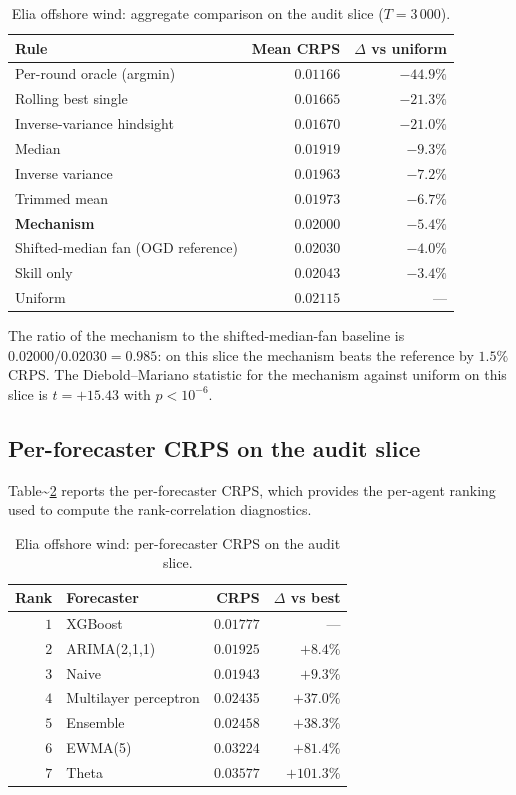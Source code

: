 \documentclass[
  11pt,
  a4paper,
  oneside]{report}
\begin{document}
\begin{table}[h]
\centering
\small
\begin{tabular}{lrr}
\toprule
Rule & Mean CRPS & $\Delta$ vs uniform \\
\midrule
Per-round oracle (argmin) & $0.01166$ & $-44.9\%$ \\
Rolling best single & $0.01665$ & $-21.3\%$ \\
Inverse-variance hindsight & $0.01670$ & $-21.0\%$ \\
Median & $0.01919$ & $-9.3\%$ \\
Inverse variance & $0.01963$ & $-7.2\%$ \\
Trimmed mean & $0.01973$ & $-6.7\%$ \\
\textbf{Mechanism} & $\mathbf{0.02000}$ & $\mathbf{-5.4\%}$ \\
Shifted-median fan (OGD reference)
  & $0.02030$ & $-4.0\%$ \\
Skill only & $0.02043$ & $-3.4\%$ \\
Uniform & $0.02115$ & --- \\
\bottomrule
\end{tabular}
\caption{Elia offshore wind: aggregate comparison on the audit slice
($T = 3\,000$).}
\label{tab:wind-audit}
\end{table}

The ratio of the mechanism to the shifted-median-fan baseline is
\(0.02000 / 0.02030 = 0.985\): on this slice the mechanism beats the
reference by \(1.5\%\) CRPS. The Diebold--Mariano statistic for the
mechanism against uniform on this slice is \(t = +15.43\) with
\(p < 10^{-6}\).

\subsection{Per-forecaster CRPS on the audit
slice}\label{per-forecaster-crps-on-the-audit-slice}

Table\textasciitilde{}\ref{tab:wind-audit-per-agent} reports the
per-forecaster CRPS, which provides the per-agent ranking used to
compute the rank-correlation diagnostics.

\begin{table}[h]
\centering
\small
\begin{tabular}{rlrr}
\toprule
Rank & Forecaster & CRPS & $\Delta$ vs best \\
\midrule
$1$ & XGBoost & $0.01777$ & --- \\
$2$ & ARIMA(2,1,1) & $0.01925$ & $+8.4\%$ \\
$3$ & Naive & $0.01943$ & $+9.3\%$ \\
$4$ & Multilayer perceptron & $0.02435$ & $+37.0\%$ \\
$5$ & Ensemble & $0.02458$ & $+38.3\%$ \\
$6$ & EWMA(5) & $0.03224$ & $+81.4\%$ \\
$7$ & Theta & $0.03577$ & $+101.3\%$ \\
\bottomrule
\end{tabular}
\caption{Elia offshore wind: per-forecaster CRPS on the audit slice.}
\label{tab:wind-audit-per-agent}
\end{table}
\end{document}
